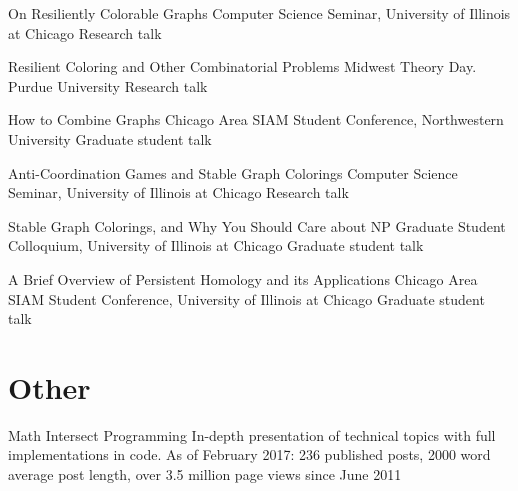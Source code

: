 \documentclass[11pt]{moderncv}
\begin{document}
  {On Resiliently Colorable Graphs}
  {Computer Science Seminar, University of Illinois at Chicago}
  {Research talk}
  {}
  {}

  {Resilient Coloring and Other Combinatorial Problems}
  {Midwest Theory Day. Purdue University}
  {Research talk}
  {}
  {}

  {How to Combine Graphs}
  {Chicago Area SIAM Student Conference, Northwestern University}
  {Graduate student talk}
  {}
  {}

  {Anti-Coordination Games and Stable Graph Colorings}
  {Computer Science Seminar, University of Illinois at Chicago}
  {Research talk}
  {}
  {}

  {Stable Graph Colorings, and Why You Should Care about NP}
  {Graduate Student Colloquium, University of Illinois at Chicago}
  {Graduate student talk}
  {}
  {}

  {A Brief Overview of Persistent Homology and its Applications}
  {Chicago Area SIAM Student Conference, University of Illinois at Chicago}
  {Graduate student talk}
  {}
  {}

\section{Other}

  {Math Intersect Programming}
  {}
  {In-depth presentation of technical topics with full implementations in code. As of February 2017: 236 published posts, 2000 word average post length, over 3.5 million page views since June 2011}
  {}
  {}
\end{document}
